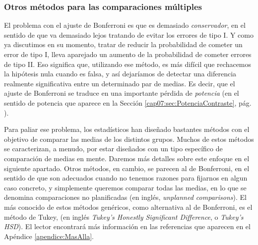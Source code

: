 \subsubsection{Otros métodos para las comparaciones múltiples}

El problema con el ajuste de Bonferroni es que es demasiado {\em conservador}, en el sentido de que va demasiado lejos tratando de evitar los errores de tipo I. Y como ya discutimos en su momento, tratar de reducir la probabilidad de cometer un error de tipo I, lleva aparejado un aumento de la probabilidad de cometer errores de tipo II. Eso significa que, utilizando ese método, es más difícil que rechacemos la hipótesis nula cuando es falsa, y así dejaríamos de detectar una diferencia realmente significativa entre un determinado par de medias. Es decir, que el ajuste de Bonferroni se traduce en una importante pérdida de {\em potencia} (en el sentido de potencia que aparece en la Sección \ref{cap07:sec:PotenciaContraste}, pág. \pageref{cap07:sec:PotenciaContraste}).

Para paliar ese problema, los estadísticos han diseñado bastantes métodos con el objetivo de comparar las medias de los distintos grupos. Muchos de estos métodos se caracterizan, a menudo, por estar diseñados con un tipo específico de comparación de medias en mente. Daremos más detalles sobre este enfoque en el siguiente apartado. Otros métodos, en cambio, se parecen al de Bonferroni, en el sentido de que son adecuados cuando no tenemos razones para fijarnos en algun caso concreto, y simplemente queremos comparar todas las medias, en lo que se denomina {\sf comparaciones no planificadas} (en inglés, {\em unplanned comparisons}). El más conocido de estos métodos genéricos, como alternativa al de Bonferroni, es el {\sf método de Tukey}, (en inglés {\em Tukey's Honestly Significant Difference}, o {\em Tukey's HSD}). El lector encontrará más información en las referencias que aparecen en el Apéndice \ref{apendice:MasAlla}.


